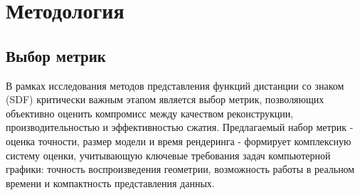 \documentclass[a4paper,hidelinks,12pt]{article}
\begin{document}
\newpage

\section{Методология}

\subsection{Выбор метрик}

В рамках исследования методов представления функций дистанции со знаком (SDF) критически 
важным этапом является выбор метрик, позволяющих объективно оценить компромисс между качеством 
реконструкции, производительностью и эффективностью сжатия. Предлагаемый набор метрик - оценка точности, 
размер модели и время рендеринга - формирует комплексную систему оценки, учитывающую ключевые 
требования задач компьютерной графики: точность воспроизведения геометрии, возможность работы в 
реальном времени и компактность представления данных.
\end{document}
